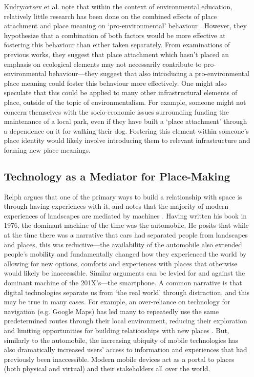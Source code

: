 Kudryavtsev et al. note that within the context of environmental education, relatively little research has been done on the combined effects of place attachment and place meaning on `pro-environmental' behaviour \citep{Kudryavtsev2012}. However, they hypothesize that a combination of both factors would be more effective at fostering this behaviour than either taken separately. From examinations of previous works, they suggest that place attachment which hasn't placed an emphasis on ecological elements may not necessarily contribute to pro-environmental behaviour---they suggest that also introducing a pro-environmental place meaning could foster this behaviour more effectively. One might also speculate that this could be applied to many other infrastructural elements of place, outside of the topic of environmentalism. For example, someone might not concern themselves with the socio-economic issues surrounding funding the maintenance of a local park, even if they have built a `place attachment' through a dependence on it for walking their dog. Fostering this element within someone's place identity would likely involve introducing them to relevant infrastructure and forming new place meanings. 

\subsection{Technology as a Mediator for Place-Making}
Relph argues that one of the primary ways to build a relationship with space is through having experiences with it, and notes that the majority of modern experiences of landscapes are mediated by machines \citep{Relph1976}. Having written his book in 1976, the dominant machine of the time was the automobile. He posits that while at the time there was a narrative that cars had separated people from landscapes and places, this was reductive---the availability of the automobile also extended people's mobility and fundamentally changed how they experienced the world by allowing for new options, comforts and experiences with places that otherwise would likely be inaccessible. Similar arguments can be levied for and against the dominant machine of the 201X's---the smartphone. A common narrative is that digital technologies separate us from `the real world' through distraction, and this may be true in many cases. For example, an over-reliance on technology for navigation (e.g. Google Maps) has led many to repeatedly use the same predetermined routes through their local environment, reducing their exploration and limiting opportunities for building relationships with new places \citep{Lochtefeld2019}. But, similarly to the automobile, the increasing ubiquity of mobile technologies has also dramatically increased users' access to information and experiences that had previously been inaccessible. Modern mobile devices act as a portal to places (both physical and virtual) and their stakeholders all over the world.

